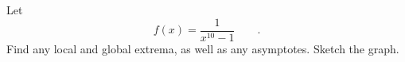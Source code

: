 Let
\begin{equation*}
  f(x) = \frac{1}{x^{10}-1} \qquad .
\end{equation*}
Find any local and global
extrema, as well as any asymptotes. Sketch the graph.
